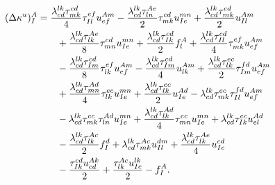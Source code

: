         \begin{align}
            (\Delta \kappa^{u})^{A}_{I}
            &=
            \frac{\lambda^{lk}_{cd} \tau^{cd}_{mk}}{4} \tau^{ef}_{Il} u^{Am}_{ef}
            - \frac{\lambda^{lk}_{cd} \tau^{Ae}_{ln}}{2} \tau^{cd}_{mk} u^{mn}_{Ie}
            + \frac{\lambda^{lk}_{cd} \tau^{cd}_{mk}}{2} u^{Am}_{Il}
            \nonumber \\
            &\qquad
            + \frac{\lambda^{lk}_{cd} \tau^{Ae}_{lk}}{8} \tau^{cd}_{mn} u^{mn}_{Ie}
            + \frac{\lambda^{lk}_{cd} \tau^{cd}_{Ik}}{2} f^{A}_{l}
            + \frac{\lambda^{lk}_{cd} \tau^{cd}_{Il}}{4} \tau^{ef}_{mk} u^{Am}_{ef}
            \nonumber \\
            &\qquad
            - \frac{\lambda^{lk}_{cd} \tau^{cd}_{Im}}{8} \tau^{ef}_{lk} u^{Am}_{ef}
            - \frac{\lambda^{lk}_{cd} \tau^{cd}_{Im}}{4} u^{Am}_{lk}
            + \frac{\lambda^{lk}_{cd} \tau^{ec}_{lk}}{2} \tau^{fd}_{Im} u^{Am}_{ef}
            \nonumber \\
            &\qquad
            + \frac{\lambda^{lk}_{cd} \tau^{Ad}_{mn}}{4} \tau^{ec}_{lk} u^{mn}_{Ie}
            + \frac{\lambda^{lk}_{cd} \tau^{ec}_{lk}}{2} u^{Ad}_{Ie}
            - \lambda^{lk}_{cd} \tau^{ec}_{mk} \tau^{fd}_{Il} u^{Am}_{ef}
            \nonumber \\
            &\qquad
            - \lambda^{lk}_{cd} \tau^{ec}_{mk} \tau^{Ad}_{ln} u^{mn}_{Ie}
            + \frac{\lambda^{lk}_{cd} \tau^{Ad}_{lk}}{4} \tau^{ec}_{mn} u^{mn}_{Ie}
            + \lambda^{lk}_{cd} \tau^{ec}_{Ik} u^{Ad}_{el}
            \nonumber \\
            &\qquad
            - \frac{\lambda^{lk}_{cd} \tau^{Ac}_{lk}}{2} f^{d}_{I}
            + \lambda^{lk}_{cd} \tau^{Ac}_{mk} u^{dm}_{Il}
            + \frac{\lambda^{lk}_{cd} \tau^{Ae}_{lk}}{4} u^{cd}_{Ie}
            \nonumber \\
            &\qquad
            - \frac{\tau^{cd}_{Ik} u^{Ak}_{cd}}{2}
            + \frac{\tau^{Ac}_{lk} u^{lk}_{Ic}}{2}
            - f^{A}_{I}.
        \end{align}

